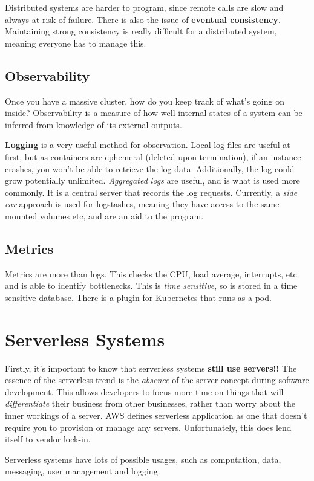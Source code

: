 \documentclass[11pt,a4paper,titlepage,dvipsnames,cmyk]{scrartcl}
\begin{document}
Distributed systems are harder to program, since remote calls are slow and always at risk of failure. There is also the issue of \textbf{eventual consistency}. Maintaining strong consistency is really difficult for a distributed system, meaning everyone has to manage this.

\subsection{Observability}
Once you have a massive cluster, how do you keep track of what's going on inside? Observability is a measure of how well internal states of a system can be inferred from knowledge of its external outputs.

\textbf{Logging} is a very useful method for observation. Local log files are useful at first, but as containers are ephemeral (deleted upon termination), if an instance crashes, you won't be able to retrieve the log data. Additionally, the log could grow potentially unlimited. \textit{Aggregated logs} are useful, and is what is used more commonly. It is a central server that records the log requests. Currently, a \textit{side car} approach is used for logstashes, meaning they have access to the same mounted volumes etc, and are an aid to the program.

\subsection{Metrics}
Metrics are more than logs. This checks the CPU, load average, interrupts, etc. and is able to identify bottlenecks. This is \textit{time sensitive}, so is stored in a time sensitive database. There is a plugin for Kubernetes that runs as a pod.

\section{Serverless Systems}
Firstly, it's important to know that serverless systems \textbf{still use servers!!} The essence of the serverless trend is the \textit{absence} of the server concept during software development. This allows developers to focus more time on things that will \textit{differentiate} their business from other businesses, rather than worry about the inner workings of a server. AWS defines serverless application as one that doesn't require you to provision or manage any servers. Unfortunately, this does lend itself to vendor lock-in.

Serverless systems have lots of possible usages, such as computation, data, messaging, user management and logging.
\end{document}
